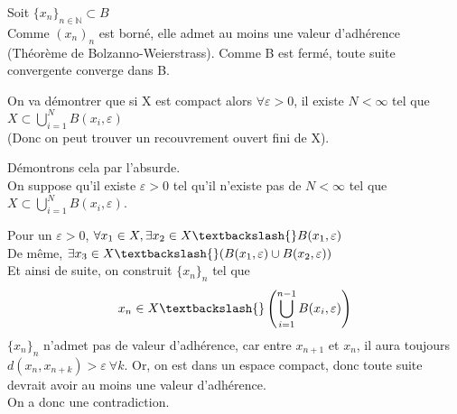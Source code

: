 
\begin{dem}
	Soit $\{x_n\}_{n\in \mathbb{N}}\subset B$\\
	Comme $(x_n)_n$ est borné, elle admet au moins une valeur d'adhérence (Théorème de Bolzanno-Weierstrass). Comme B est fermé, toute suite convergente converge dans B.
\end{dem}


\begin{dem}
	On va démontrer que si X est compact alors $\forall\varepsilon>0$, il existe $N<\infty$ tel que $X\subset\bigcup_{i=1}^N B(x_i,\varepsilon)$\\
	(Donc on peut trouver un recouvrement ouvert fini de X).

	\bigskip
	Démontrons cela par l'absurde.\\
	On suppose qu'il existe $\varepsilon>0$ tel qu'il n'existe pas de $N<\infty$ tel que $X\subset \bigcup_{i=1}^N B(x_i,\varepsilon)$.

	Pour un $\varepsilon>0$, $\forall x_1\in X, \exists x_2\in X\textbackslash{} B(x_1,\varepsilon)$\\
	De même, $\exists x_3\in X\textbackslash{}(B(x_1,\varepsilon)\cup B(x_2,\varepsilon))$\\
	Et ainsi de suite, on construit $\{x_n\}_n$ tel que
	\[x_n\in X\textbackslash{}\left( \bigcup_{i=1}^{n-1}B(x_i,\varepsilon)\right)\]
	$\{x_n\}_n$ n'admet pas de valeur d'adhérence, car entre $x_{n+1}$ et $x_n$, il aura toujours $d(x_n,x_{n+k})>\varepsilon\ \forall k$. Or, on est dans un espace compact, donc toute suite devrait avoir au moins une valeur d'adhérence.\\
	On a donc une contradiction.
\end{dem}



